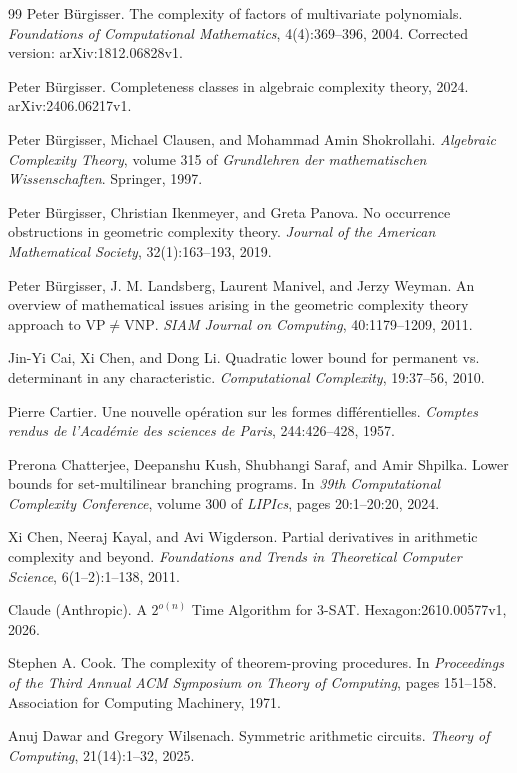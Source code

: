 \begin{thebibliography}{99}
Peter Bürgisser. The complexity of factors of multivariate polynomials. \emph{Foundations of
Computational Mathematics}, 4(4):369--396, 2004. Corrected version: arXiv:1812.06828v1.

Peter Bürgisser. Completeness classes in algebraic complexity theory, 2024. arXiv:2406.06217v1.

Peter Bürgisser, Michael Clausen, and Mohammad Amin Shokrollahi. \emph{Algebraic Complexity
Theory}, volume 315 of \emph{Grundlehren der mathematischen Wissenschaften}. Springer, 1997.

Peter Bürgisser, Christian Ikenmeyer, and Greta Panova. No occurrence obstructions in geometric
complexity theory. \emph{Journal of the American Mathematical Society}, 32(1):163--193, 2019.

Peter Bürgisser, J. M. Landsberg, Laurent Manivel, and Jerzy Weyman. An overview of
mathematical issues arising in the geometric complexity theory approach to
$\mathrm{VP}\ne \mathrm{VNP}$. \emph{SIAM
Journal on Computing}, 40:1179--1209, 2011.

Jin-Yi Cai, Xi Chen, and Dong Li. Quadratic lower bound for permanent vs. determinant in
any characteristic. \emph{Computational Complexity}, 19:37--56, 2010.

Pierre Cartier. Une nouvelle opération sur les formes différentielles. \emph{Comptes rendus de
l'Académie des sciences de Paris}, 244:426--428, 1957.

Prerona Chatterjee, Deepanshu Kush, Shubhangi Saraf, and Amir Shpilka. Lower bounds for
set-multilinear branching programs. In \emph{39th Computational Complexity Conference}, volume 300
of \emph{LIPIcs}, pages 20:1--20:20, 2024.

Xi Chen, Neeraj Kayal, and Avi Wigderson. Partial derivatives in arithmetic complexity and
beyond. \emph{Foundations and Trends in Theoretical Computer Science}, 6(1--2):1--138, 2011.

Claude (Anthropic). A $2^{o(n)}$ Time Algorithm for 3-SAT. Hexagon:2610.00577v1, 2026.

Stephen A. Cook. The complexity of theorem-proving procedures. In \emph{Proceedings of the Third
Annual ACM Symposium on Theory of Computing}, pages 151--158. Association for Computing
Machinery, 1971.

Anuj Dawar and Gregory Wilsenach. Symmetric arithmetic circuits. \emph{Theory of Computing},
21(14):1--32, 2025.


\end{thebibliography}
